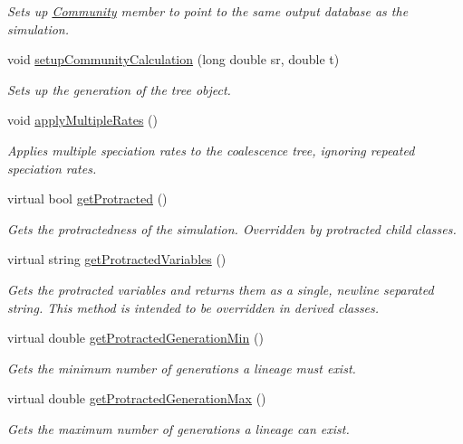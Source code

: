 \begin{DoxyCompactItemize}
\begin{DoxyCompactList}\small\item\em Sets up \hyperlink{class_community}{Community} member to point to the same output database as the simulation. \end{DoxyCompactList}\item 
void \hyperlink{class_tree_aaa85f6886029ee48472241cab746ded1}{setup\+Community\+Calculation} (long double sr, double t)
\begin{DoxyCompactList}\small\item\em Sets up the generation of the tree object. \end{DoxyCompactList}\item 
void \hyperlink{class_tree_acfc7efdec999f6dbf2ac089514d22091}{apply\+Multiple\+Rates} ()
\begin{DoxyCompactList}\small\item\em Applies multiple speciation rates to the coalescence tree, ignoring repeated speciation rates. \end{DoxyCompactList}\item 
virtual bool \hyperlink{class_tree_aa23a57f7863d58384f61d464d998ab3c}{get\+Protracted} ()
\begin{DoxyCompactList}\small\item\em Gets the protractedness of the simulation. Overridden by protracted child classes. \end{DoxyCompactList}\item 
virtual string \hyperlink{class_tree_a34c0808026bf00546c8f9786376be730}{get\+Protracted\+Variables} ()
\begin{DoxyCompactList}\small\item\em Gets the protracted variables and returns them as a single, newline separated string. This method is intended to be overridden in derived classes. \end{DoxyCompactList}\item 
virtual double \hyperlink{class_tree_a6ffc42e941f352cd74f01f6f7011f00b}{get\+Protracted\+Generation\+Min} ()
\begin{DoxyCompactList}\small\item\em Gets the minimum number of generations a lineage must exist. \end{DoxyCompactList}\item 
virtual double \hyperlink{class_tree_a0c5e746982a87f24c083f4534bf92b45}{get\+Protracted\+Generation\+Max} ()
\begin{DoxyCompactList}\small\item\em Gets the maximum number of generations a lineage can exist. \end{DoxyCompactList}\item 

\end{DoxyCompactItemize}

